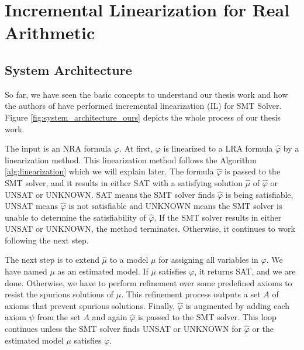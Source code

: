 \chapter{Incremental Linearization for Real Arithmetic}
\label{chap:Incremental_Linearization_For_Real_Arithmetic}

\section{System Architecture}
\label{sec:system_architecture}
So far, we have seen the basic concepts to understand our thesis work and how the authors of \cite{Cimatti:2018:ILS:3274693.3230639} have performed incremental linearization (IL) for SMT Solver.
Figure \ref{fig:system_architecture_ours} depicts the whole process of our thesis work.\newline

\noindent The input is an NRA formula $\varphi$.
At first, $\varphi$ is linearized to a LRA formula $\hat{\varphi}$ by a linearization method.
This linearization method follows the Algorithm \ref{alg:linearization} which we will explain later.
The formula $\hat{\varphi}$ is passed to the SMT solver, and it results in either SAT with a satisfying solution $\hat{\mu}$ of $\hat{\varphi}$ or UNSAT or UNKNOWN.
SAT means the SMT solver finds $\hat{\varphi}$ is being satisfiable, UNSAT means $\hat{\varphi}$ is not satisfiable and UNKNOWN means the SMT solver is unable to determine the satisfiability of $\hat{\varphi}$.
If the SMT solver results in either UNSAT or UNKNOWN, the method terminates.
Otherwise, it continues to work following the next step.\newline

\noindent The next step is to extend $\hat{\mu}$ to a model $\mu$ for assigning all variables in $\varphi$.
We have named $\mu$ as an estimated model.
If $\mu$ satisfies $\varphi$, it returns SAT, and we are done.
Otherwise, we have to perform refinement over some predefined axioms to resist the spurious solutions of $\mu$.
This refinement process outputs a set $A$ of axioms that prevent spurious solutions.
Finally, $\hat{\varphi}$ is augmented by adding each axiom $\psi$ from the set $A$ and again $\hat{\varphi}$ is passed to the SMT solver.
This loop continues unless the SMT solver finds UNSAT or UNKNOWN for $\hat{\varphi}$ or the estimated model $\mu$ satisfies $\varphi$.\newline

